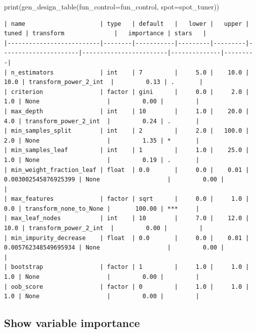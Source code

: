 \documentclass[
  letterpaper,
  DIV=11,
  numbers=noendperiod]{scrreprt}
\newenvironment{Shaded}{\begin{snugshade}}{\end{snugshade}}
\newcommand{\BuiltInTok}[1]{\textcolor[rgb]{0.00,0.23,0.31}{#1}}
\newcommand{\NormalTok}[1]{\textcolor[rgb]{0.00,0.23,0.31}{#1}}
\newcommand{\OperatorTok}[1]{\textcolor[rgb]{0.37,0.37,0.37}{#1}}
\begin{document}
\begin{Shaded}
\begin{Highlighting}[]
\BuiltInTok{print}\NormalTok{(gen\_design\_table(fun\_control}\OperatorTok{=}\NormalTok{fun\_control,}
\NormalTok{    spot}\OperatorTok{=}\NormalTok{spot\_tuner))}
\end{Highlighting}
\end{Shaded}

\begin{verbatim}
| name                     | type   | default   |   lower |   upper |                tuned | transform              |   importance | stars   |
|--------------------------|--------|-----------|---------|---------|----------------------|------------------------|--------------|---------|
| n_estimators             | int    | 7         |     5.0 |    10.0 |                 10.0 | transform_power_2_int  |         0.13 | .       |
| criterion                | factor | gini      |     0.0 |     2.0 |                  1.0 | None                   |         0.00 |         |
| max_depth                | int    | 10        |     1.0 |    20.0 |                  4.0 | transform_power_2_int  |         0.24 | .       |
| min_samples_split        | int    | 2         |     2.0 |   100.0 |                  2.0 | None                   |         1.35 | *       |
| min_samples_leaf         | int    | 1         |     1.0 |    25.0 |                  1.0 | None                   |         0.19 | .       |
| min_weight_fraction_leaf | float  | 0.0       |     0.0 |    0.01 | 0.003002545876925399 | None                   |         0.00 |         |
| max_features             | factor | sqrt      |     0.0 |     1.0 |                  0.0 | transform_none_to_None |       100.00 | ***     |
| max_leaf_nodes           | int    | 10        |     7.0 |    12.0 |                 10.0 | transform_power_2_int  |         0.00 |         |
| min_impurity_decrease    | float  | 0.0       |     0.0 |    0.01 | 0.005762348549695934 | None                   |         0.00 |         |
| bootstrap                | factor | 1         |     1.0 |     1.0 |                  1.0 | None                   |         0.00 |         |
| oob_score                | factor | 0         |     1.0 |     1.0 |                  1.0 | None                   |         0.00 |         |
\end{verbatim}

\hypertarget{show-variable-importance-1}{%
\subsection{Show variable importance}\label{show-variable-importance-1}}
\end{document}
